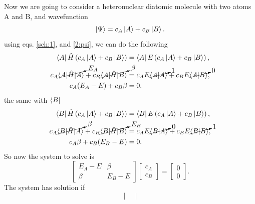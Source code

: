 \begin{questions}
\begin{solution}
Now we are going to consider a heteronuclear diatomic molecule with two atoms A and B, and wavefunction
\begin{equation}
  \ket{\Psi} = c_A \ket{A} + c_B \ket{B}.
  \label{2:psi}
\end{equation}
using eqs. \ref{sch:1}, and \ref{2:psi}, we can do the following
\begin{equation}
  \begin{aligned}[b]
    \bra{A}\hat{H}\left( c_A\ket{A} + c_B \ket{B} \right) &= \bra{A} E \left( c_A\ket{A} + c_B \ket{B} \right), \\
    c_A\cancelto{E_A}{\braket{A|\hat{H}|A}} + c_B\cancelto{\beta}{\braket{A|\hat{H}|B}} &= c_AE\cancelto{1}{\braket{A|A}} + c_BE\cancelto{0}{\braket{A|B}}, \\
    c_A(E_A - E) + c_B\beta &= 0.
  \end{aligned}
  \label{2:sys:1}
\end{equation}
the same with $\bra{B}$
\begin{equation}
  \begin{aligned}[b]
    \bra{B}\hat{H}\left( c_A\ket{A} + c_B \ket{B} \right) &= \bra{B} E \left( c_A\ket{A} + c_B \ket{B} \right), \\
    c_A\cancelto{\beta}{\braket{B|\hat{H}|A}} + c_B\cancelto{E_B}{\braket{B|\hat{H}|B}} &= c_AE\cancelto{0}{\braket{B|A}} + c_BE\cancelto{1}{\braket{B|B}}, \\
    c_A\beta + c_B(E_B-E) &= 0.
  \end{aligned}
  \label{2:sys:2}
\end{equation}
So now the system to solve is
\begin{equation}
  \begin{bmatrix}
    E_A - E & \beta \\
    \beta & E_B - E
  \end{bmatrix}
  \begin{bmatrix}
    c_A \\
    c_B
  \end{bmatrix}
  =
  \begin{bmatrix}
    0 \\
    0
  \end{bmatrix}.
  \label{2:sys:full}
\end{equation}
The system has solution if
\begin{equation}
  \begin{vmatrix}

\end{vmatrix}
\end{equation}
\end{solution}
\end{questions}
